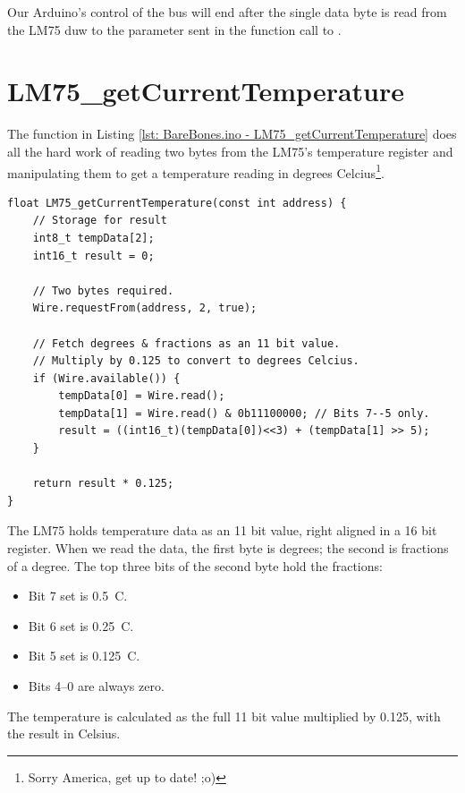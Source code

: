 Our Arduino's control of the \twi{} bus will end after the single data byte is read from the LM75 duw to the  parameter sent in the function call to .

\section{LM75\_getCurrentTemperature}

The function  in Listing \ref{lst: BareBones.ino - LM75_getCurrentTemperature} does all the hard work of reading two bytes from the LM75's temperature register and manipulating them to get a temperature reading in degrees Celcius\footnote{Sorry America, get up to date! ;o)}.

\begin{lstlisting}[caption={BareBones.ino - LM75\_getCurrentTemperature.},label={lst: BareBones.ino - LM75_getCurrentTemperature}, style=myArduino, firstnumber=129]
float LM75_getCurrentTemperature(const int address) {
    // Storage for result
    int8_t tempData[2];
    int16_t result = 0;

    // Two bytes required.
    Wire.requestFrom(address, 2, true);

    // Fetch degrees & fractions as an 11 bit value.
    // Multiply by 0.125 to convert to degrees Celcius.
    if (Wire.available()) {
        tempData[0] = Wire.read();
        tempData[1] = Wire.read() & 0b11100000; // Bits 7--5 only.
        result = ((int16_t)(tempData[0])<<3) + (tempData[1] >> 5);
    }

    return result * 0.125;
}
\end{lstlisting}

The LM75 holds temperature data as an 11 bit value, right aligned in a 16 bit register. When we read the data, the first byte is degrees; the second is fractions of a degree. The top three bits of the second byte hold the fractions:

\begin{itemize}
    \item Bit 7 set is 0.5\textdegree{}~C.
    \item Bit 6 set is 0.25\textdegree{}~C.
    \item Bit 5 set is 0.125\textdegree{}~C.
    \item Bits 4--0 are always zero.
\end{itemize}

The temperature is calculated as the full 11 bit value multiplied by 0.125, with the result in Celsius.

